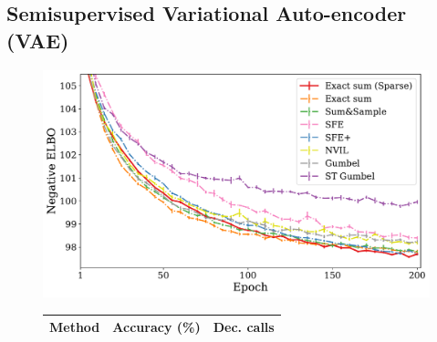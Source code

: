 \subsection{Semisupervised Variational Auto-encoder (VAE)}\label{sec:gen}
%

\begin{figure}[t]
    \begin{minipage}[c]{0.52\linewidth}
        \vspace{0pt}
        \centering
        \includegraphics[width=.9\textwidth]{Figures/ss_mnist_elbo_path.pdf}
        \vspace{0pt}
    \end{minipage}
    \begin{minipage}[c]{0.45\linewidth}
        \vspace{0pt}
        \centering
        \small
        \begin{tabular}{lrr}
            \toprule
            Method &
            Accuracy (\%)
                   & Dec. calls                                                                 \\
            \midrule


\end{tabular}
\end{minipage}
\end{figure}
